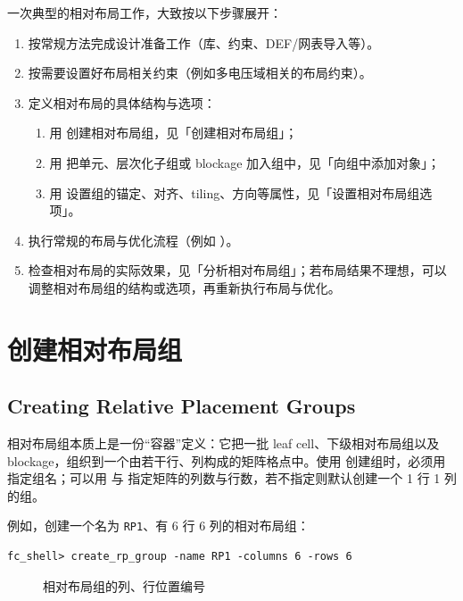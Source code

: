 一次典型的相对布局工作，大致按以下步骤展开：
\begin{enumerate}
  \item 按常规方法完成设计准备工作（库、约束、DEF/网表导入等）。
  \item 按需要设置好布局相关约束（例如多电压域相关的布局约束）。
  \item 定义相对布局的具体结构与选项：
  \begin{enumerate}
    \item 用  创建相对布局组，见「创建相对布局组」；
    \item 用  把单元、层次化子组或 blockage 加入组中，见「向组中添加对象」；
    \item 用  设置组的锚定、对齐、tiling、方向等属性，见「设置相对布局组选项」。
  \end{enumerate}
  \item 执行常规的布局与优化流程（例如 ）。
  \item 检查相对布局的实际效果，见「分析相对布局组」；若布局结果不理想，可以调整相对布局组的结构或选项，再重新执行布局与优化。
\end{enumerate}

\section{创建相对布局组}
\subsection*{Creating Relative Placement Groups}

相对布局组本质上是一份“容器”定义：它把一批 leaf cell、下级相对布局组以及 blockage，组织到一个由若干行、列构成的矩阵格点中。使用  创建组时，必须用  指定组名；可以用  与  指定矩阵的列数与行数，若不指定则默认创建一个 1 行 1 列的组。

例如，创建一个名为 \texttt{RP1}、有 6 行 6 列的相对布局组：
\begin{lstlisting}
fc_shell> create_rp_group -name RP1 -columns 6 -rows 6
\end{lstlisting}

\begin{figure}[htbp]
\centering
{}
\caption{相对布局组的列、行位置编号}
\label{fig:rp-rowcol}
\end{figure}

